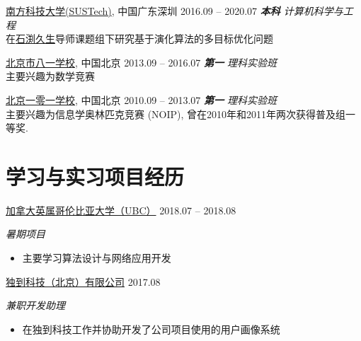 \documentclass[hidelinks__VERSION__]{adamyi-cv}
\begin{document}
\begin{entrylist}


\entry
{\href{https://www.sustech.edu.cn/}{\heir 南方科技大学(SUSTech)}, \hei 中国广东深圳}
{2016.09 -- 2020.07}
{\hei \emph{\textbf{\hei 本科} 计算机科学与工程}\\
在\href{http://cse.sustc.edu.cn/en/people/view/people_id/55/sort_id/9/pid/}{\hei 石渕久生}导师课题组下研究基于演化算法的多目标优化问题
}

\entry
{\href{http://bayims.cn/}{\heir 北京市八一学校}, \hei 中国北京}
{2013.09 -- 2016.07}
{\hei \emph{\textbf{\heir 第一} 理科实验班}\\
主要兴趣为数学竞赛
}

\entry
{\href{http://beijing101.com}{\heir 北京一零一学校}, \hei 中国北京}
{2010.09 -- 2013.07}
{\hei \emph{\textbf{\heir 第一} \hei 理科实验班}\\
主要兴趣为信息学奥林匹克竞赛 (NOIP), 曾在2010年和2011年两次获得普及组一等奖.
}

\end{entrylist}


\section{\heir 学习\heir 与实习项目经历}

\begin{entrylist}


\entry
{\href{https://www.ubc.ca/}{\heir 加拿大英属哥伦比亚大学（UBC）}}
{2018.07 -- 2018.08}
{\emph{\hei 暑期项目}
\begin{itemize}
\item {\hei 主要学习算法设计与网络应用开发}
\end{itemize}}


\entry
{\href{http://www.doodod.com/}{\heir 独到科技（北京）有限公司}}
{2017.08}
{\emph{\hei 兼职开发助理}
\begin{itemize}
\item {\hei 在独到科技工作并协助开发了公司项目使用的用户画像系统}
\end{itemize}}


\end{entrylist}
\end{document}
